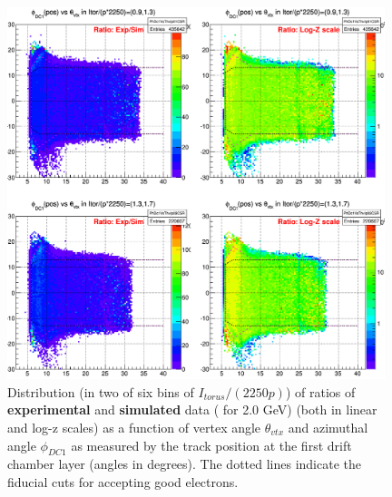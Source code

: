 \begin{figure}[H]%
\centering
\leavevmode \includegraphics[width=0.98\textwidth]{figuresEG4/NewP2/FidCuts/fidCutPlotsSet2_Eb2_RatioBiggerCroppedIpBins0n1.png}
\caption[Fiducial cuts ]{Distribution (in two of six bins of $I_{torus}/(2250 p)$) of %
ratios of {\bf experimental} and {\bf simulated} data ( for 2.0 GeV) (both in linear and log-z scales) as a function of vertex angle $\theta_{vtx}$ and azimuthal angle $\phi_{DC1}$ as measured by the track position at the first drift chamber layer (angles in degrees). The dotted lines indicate the fiducial cuts for accepting good electrons. %
} %
\label{figFidExpVsSim}
\end{figure}


